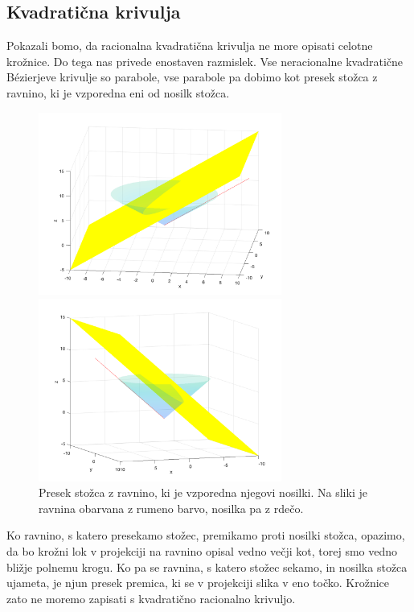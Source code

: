 \documentclass[a4paper,11pt]{article}
\theoremstyle{definition}
\theoremstyle{plain}
\begin{document}
\subsection{ Kvadratična krivulja}\label{kvadraticna}
Pokazali bomo, da racionalna kvadratična krivulja ne more opisati celotne krožnice. Do tega nas privede enostaven razmislek. 
Vse neracionalne kvadratične B\'ezierjeve krivulje so parabole, vse parabole pa dobimo kot presek stožca z ravnino, ki je vzporedna eni od nosilk stožca. 
\begin{figure}[ht!]
    \begin{minipage}{0.5\textwidth}
        \centering
        \includegraphics[width=80mm]{stozec_presek_1.png}
    \end{minipage}\hfill
    \begin{minipage}{0.5\textwidth}
        \centering
        \includegraphics[width=80mm]{stozec_presek_2.png}
    \end{minipage}\hfill
    \caption{Presek stožca z ravnino, ki je vzporedna njegovi nosilki. Na sliki je ravnina obarvana z rumeno barvo, nosilka pa z rdečo.}
\end{figure}

\noindent
Ko ravnino, s katero presekamo stožec, premikamo proti nosilki stožca, opazimo, da bo krožni lok v projekciji na ravnino opisal vedno večji kot, torej smo vedno bližje polnemu krogu. 
Ko pa se ravnina, s katero stožec sekamo, in nosilka stožca ujameta, je njun presek premica, ki se v projekciji slika v eno točko. 
Krožnice zato ne moremo zapisati s kvadratično racionalno krivuljo. 
\end{document}
